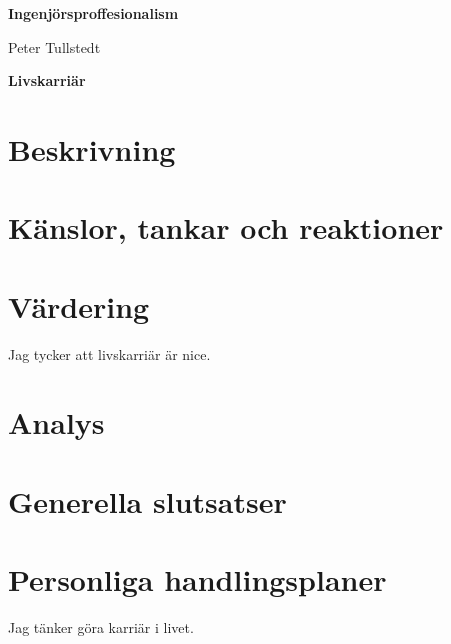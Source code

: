 \documentclass[12pt,a4paper]{article}
\begin{document}
\begin{center}
    \Huge
    \textbf{Ingenjörsproffesionalism}

    \vspace{0.3cm}
    \Large
    Peter Tullstedt
    
    \vspace{0.7cm}
    \textbf{Livskarriär}
\end{center}


\section{Beskrivning}

\section{Känslor, tankar och reaktioner}


\section{Värdering}
Jag tycker att livskarriär är nice.

\section{Analys}

\section{Generella slutsatser}

\section{Personliga handlingsplaner}
Jag tänker göra karriär i livet.
\end{document}
